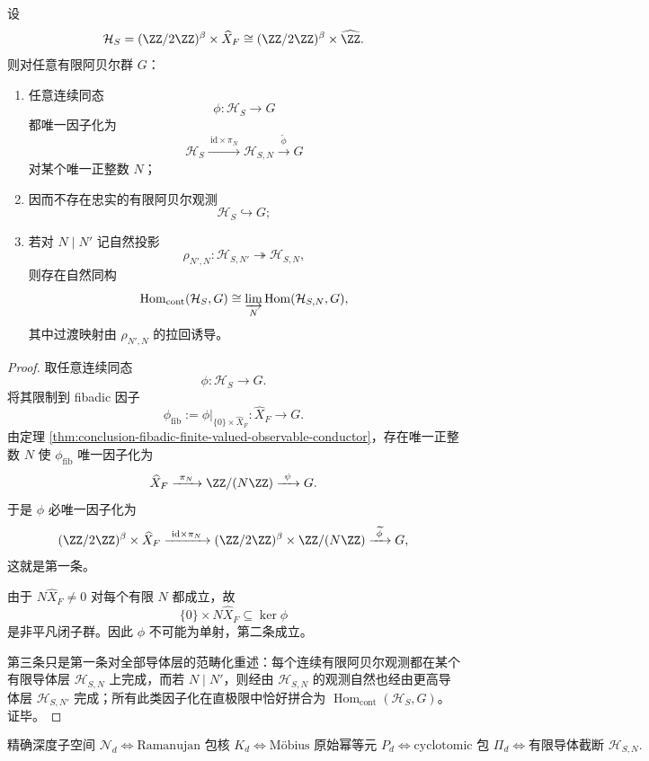 \begin{theorem}[全局混合隐藏态不存在忠实有限阿贝尔观测]\label{thm:conclusion-global-mixed-hidden-state-no-faithful-finite-abelian-observation}
设
\[
\mathcal H_S=(\ZZ/2\ZZ)^\beta\times \widehat X_F
\cong
(\ZZ/2\ZZ)^\beta\times \widehat{\ZZ}.
\]
则对任意有限阿贝尔群 \(G\)：
\begin{enumerate}
  \item 任意连续同态
  \[
  \phi:\mathcal H_S\to G
  \]
  都唯一因子化为
  \[
  \mathcal H_S\xrightarrow{\ \mathrm{id}\times \pi_N\ } \mathcal H_{S,N}
  \xrightarrow{\ \widetilde\phi\ } G
  \]
  对某个唯一正整数 \(N\)；
  \item 因而不存在忠实的有限阿贝尔观测
  \[
  \mathcal H_S\hookrightarrow G;
  \]
  \item 若对 \(N\mid N'\) 记自然投影
  \[
  \rho_{N',N}:\mathcal H_{S,N'}\twoheadrightarrow \mathcal H_{S,N},
  \]
  则存在自然同构
  \[
  \operatorname{Hom}_{\mathrm{cont}}(\mathcal H_S,G)
  \cong
  \varinjlim_{N}\operatorname{Hom}(\mathcal H_{S,N},G),
  \]
  其中过渡映射由 \(\rho_{N',N}\) 的拉回诱导。
\end{enumerate}
\end{theorem}
\begin{proof}
取任意连续同态
\[
\phi:\mathcal H_S\to G.
\]
将其限制到 fibadic 因子
\[
\phi_{\mathrm{fib}}:=\phi|_{\{0\}\times \widehat X_F}:\widehat X_F\to G.
\]
由定理 \ref{thm:conclusion-fibadic-finite-valued-observable-conductor}，存在唯一正整数 \(N\) 使 \(\phi_{\mathrm{fib}}\) 唯一因子化为
\[
\widehat X_F\xrightarrow{\ \pi_N\ }\ZZ/(N\ZZ)\xrightarrow{\ \psi\ }G.
\]
于是 \(\phi\) 必唯一因子化为
\[
(\ZZ/2\ZZ)^\beta\times \widehat X_F
\xrightarrow{\ \mathrm{id}\times \pi_N\ }
(\ZZ/2\ZZ)^\beta\times \ZZ/(N\ZZ)
\xrightarrow{\ \widetilde\phi\ }G,
\]
这就是第一条。

由于 \(N\widehat X_F\neq 0\) 对每个有限 \(N\) 都成立，故
\[
\{0\}\times N\widehat X_F\subseteq \ker\phi
\]
是非平凡闭子群。因此 \(\phi\) 不可能为单射，第二条成立。

第三条只是第一条对全部导体层的范畴化重述：每个连续有限阿贝尔观测都在某个有限导体层 \(\mathcal H_{S,N}\) 上完成，而若 \(N\mid N'\)，则经由 \(\mathcal H_{S,N}\) 的观测自然也经由更高导体层 \(\mathcal H_{S,N'}\) 完成；所有此类因子化在直极限中恰好拼合为 \(\operatorname{Hom}_{\mathrm{cont}}(\mathcal H_S,G)\)。证毕。
\end{proof}



\[
\boxed{\text{精确深度子空间 }\mathcal N_d}
\Longleftrightarrow
\boxed{\text{Ramanujan 包核 }K_d}
\Longleftrightarrow
\boxed{\text{M\"obius 原始幂等元 }P_d}
\Longleftrightarrow
\boxed{\text{cyclotomic 包 }\Pi_d}
\Longleftrightarrow
\boxed{\text{有限导体截断 }\mathcal H_{S,N}}.
\]


